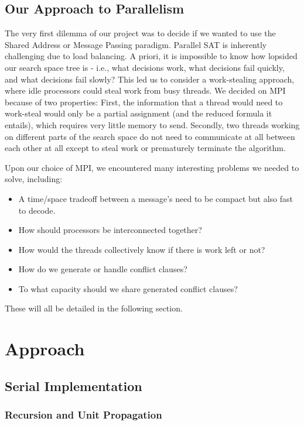 \documentclass{article}
\begin{document}
\subsection{Our Approach to Parallelism}
The very first dilemma of our project was to decide if we wanted to use the Shared Address or Message Passing paradigm.
Parallel SAT is inherently challenging due to load balancing.
A priori, it is impossible to know how lopsided our search space tree is - i.e., what decisions work, what decisions fail quickly, and what decisions fail slowly?
This led us to consider a work-stealing approach, where idle processors could steal work from busy threads.
We decided on MPI because of two properties:
First, the information that a thread would need to work-steal would only be a partial assignment (and the reduced formula it entails), which requires very little memory to send.
Secondly, two threads working on different parts of the search space do not need to communicate at all between each other at all except to steal work or prematurely terminate the algorithm.

Upon our choice of MPI, we encountered many interesting problems we needed to solve, including:
\begin{itemize}
    \item A time/space tradeoff between a message's need to be compact but also fast to decode.
    \item How should processors be interconnected together?
    \item How would the threads collectively know if there is work left or not?
    \item How do we generate or handle conflict clauses? 
    \item To what capacity should we share generated conflict clauses?
\end{itemize}
These will all be detailed in the following section.

\section{Approach}

\subsection{Serial Implementation}

\subsubsection{Recursion and Unit Propagation}
\end{document}
